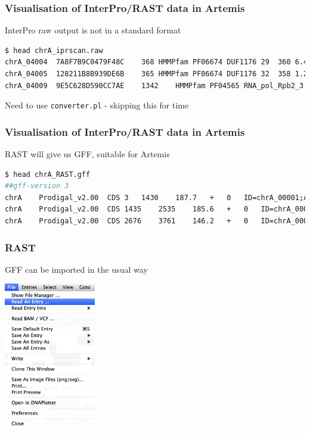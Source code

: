\documentclass[table]{beamer}
\begin{document}
  \begin{frame}[fragile]
    \frametitle{Visualisation of InterPro/RAST data in Artemis}
    InterPro raw output is not in a standard format
\begin{lstlisting}[language=bash]
$ head chrA_iprscan.raw 
chrA_04004	7A8F7B9C0479F48C	368	HMMPfam	PF06674	DUF1176	29	360	6.499999999999917E-49	T	23-Mar-2012	IPR009560	Protein of unknown function DUF1176	
chrA_04005	128211B8B939DE6B	365	HMMPfam	PF06674	DUF1176	32	358	1.2000000000000004E-61	T	23-Mar-2012	IPR009560	Protein of unknown function DUF1176	
chrA_04009	9E5C628D590CC7AE	1342	HMMPfam	PF04565	RNA_pol_Rpb2_3	513	582	1.4999999999999956E-29	T	23-Mar-2012	IPR007645	RNA polymerase Rpb2, domain 3	Molecular Function: DNA binding (GO:0003677), Molecular Function: DNA-directed RNA polymerase activity (GO:0003899), Biological Process: transcription, DNA-dependent (GO:0006351)
\end{lstlisting}
    Need to use \texttt{converter.pl} - skipping this for time
\end{frame}

  \begin{frame}[fragile]
    \frametitle{Visualisation of InterPro/RAST data in Artemis}
    RAST will give us GFF, suitable for Artemis
\begin{lstlisting}[language=bash]
$ head chrA_RAST.gff
##gff-version 3
chrA	Prodigal_v2.00	CDS	3	1430	187.7	+	0	ID=chrA_00001;Alias=fig|556.22.peg.1;Name=Chromosomal replication initiator protein DnaA
chrA	Prodigal_v2.00	CDS	1435	2535	185.6	+	0	ID=chrA_00002;Alias=fig|556.22.peg.2;Name=DNA polymerase III beta subunit (EC 2.7.7.7);Ontology_term=KEGG_ENZYME:2.7.7.7
chrA	Prodigal_v2.00	CDS	2676	3761	146.2	+	0	ID=chrA_00003;Alias=fig|556.22.peg.3;Name=DNA recombination and repair protein RecF
\end{lstlisting}
\end{frame}

    \begin{frame}
      \frametitle{RAST}   
      GFF can be imported in the usual way
      \begin{center}
        \includegraphics[width=0.3\textwidth]{images/rast0} 
      \end{center}        
    \end{frame}
\end{document}
